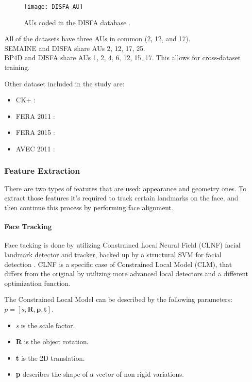 \begin{figure}[H]
	\centering
	\texttt{[image: DISFA\_AU]}
	\caption{AUs coded in the DISFA database \cite{DISFA_AU}.}
	\label{fig:DISFA_AU}
\end{figure}

All of the datasets have three AUs in common (2, 12, and 17). \\
SEMAINE and DISFA share AUs 2, 12, 17, 25. \\
BP4D and DISFA share AUs 1, 2, 4, 6, 12, 15, 17. This allows for cross-dataset training.

Other dataset included in the study are:
\begin{itemize}[noitemsep]
	\item CK+ \cite{CK+}: 
	\item FERA 2011 \cite{FERA11}:
	\item FERA 2015 \cite{FERA15}:
	\item AVEC 2011 \cite{AVEC11}:
\end{itemize}


\subsubsection{Feature Extraction}
There are two types of features that are used: appearance and geometry ones. To extract those features it's required to track certain landmarks on the face, and then continue this process by performing face alignment.

\paragraph{Face Tracking}

Face tacking is done by utilizing Constrained Local Neural Field (CLNF) facial landmark detector and tracker, backed up by a structural SVM for facial detection \cite{Baltru2013}.
CLNF is a specific case of Constrained Local Model (CLM), that differs from the original by utilizing more advanced local detectors and a different optimization function.

The Constrained Local Model can be described by the following parameters: \\
$p = [s, \mathbf{R}, \mathbf{p}, \mathbf{t}]$.
\begin{itemize}[noitemsep, topsep = -5pt]
	\item \textit{s} is the scale factor.
	\item \textbf{R} is the object rotation.
	\item \textbf{t} is the 2D translation.
	\item \textbf{p} describes the shape of a vector of non rigid variations.
\end{itemize}

